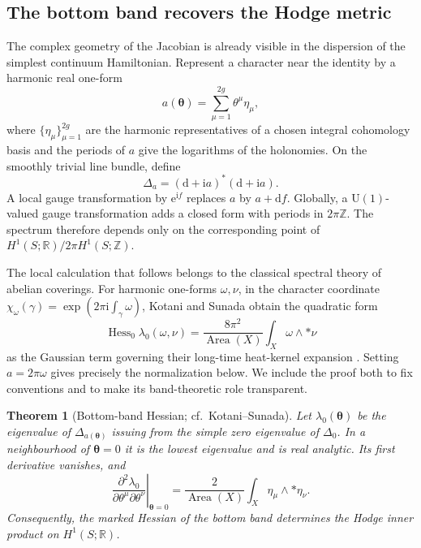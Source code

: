 \documentclass[11pt]{article}
\newtheorem{theorem}{Theorem}[section]
\theoremstyle{definition}
\theoremstyle{remark}
\newcommand{\RR}{\mathbb R}
\newcommand{\ZZ}{\mathbb Z}
\newcommand{\UU}{\mathrm U}
\newcommand{\dd}{\mathrm d}
\newcommand{\ii}{\mathrm i}
\newcommand{\e}{\mathrm e}
\begin{document}
\subsection{The bottom band recovers the Hodge metric}

The complex geometry of the Jacobian is already visible in the dispersion of
the simplest continuum Hamiltonian.  Represent a character near the identity
by a harmonic real one-form
\[
                a(\bm\theta)=\sum_{\mu=1}^{2g}
                    \theta^\mu\eta_\mu ,
                \tag{5.5}\label{eq:harmonic-flat-potential}
\]
where \(\{\eta_\mu\}_{\mu=1}^{2g}\) are the harmonic representatives of a
chosen integral cohomology basis and the periods of \(a\) give the logarithms
of the holonomies.  On the smoothly trivial line bundle, define
\[
              \Delta_{a}
                =(\dd+\ii a)^*(\dd+\ii a).
                \tag{5.6}\label{eq:magnetic-flat-laplacian}
\]
A local gauge transformation by \(\e^{\ii f}\) replaces \(a\) by
\(a+\dd f\).  Globally, a \(\UU(1)\)-valued gauge transformation adds a
closed form with periods in \(2\pi\ZZ\).  The spectrum therefore depends only
on the corresponding point of
\(H^1(S;\RR)/2\pi H^1(S;\ZZ)\).

The local calculation that follows belongs to the classical spectral theory
of abelian coverings.  For harmonic one-forms \(\omega,\nu\), in the
character coordinate
\(\chi_\omega(\gamma)=\exp(2\pi\ii\int_\gamma\omega)\), Kotani and Sunada
obtain the quadratic form
\[
  \operatorname{Hess}_0\lambda_0(\omega,\nu)
    =\frac{8\pi^2}{\operatorname{Area}(X)}
       \int_X\omega\wedge *\nu
\]
as the Gaussian term governing their long-time heat-kernel expansion
\cite{KotaniSunada2000}.  Setting \(a=2\pi\omega\) gives precisely the
normalization below.  We include the proof both to fix conventions and to
make its band-theoretic role transparent.

\begin{theorem}[Bottom-band Hessian; cf.\ Kotani--Sunada]
\label{thm:hodge-hessian}
Let \(\lambda_0(\bm\theta)\) be the eigenvalue of
\(\Delta_{a(\bm\theta)}\) issuing from the simple zero eigenvalue of
\(\Delta_0\).  In a neighbourhood of \(\bm\theta=0\) it is the lowest
eigenvalue and is real analytic.  Its first derivative vanishes, and
\[
 \left.
 \frac{\partial^2\lambda_0}
      {\partial\theta^\mu\partial\theta^\nu}
 \right|_{\bm\theta=0}
   =
 \frac{2}{\operatorname{Area}(X)}
 \int_X\eta_\mu\wedge *\eta_\nu .
 \tag{5.7}\label{eq:hodge-hessian}
\]
Consequently, the marked Hessian of the bottom band determines the Hodge
inner product on \(H^1(S;\RR)\).
\end{theorem}
\end{document}
